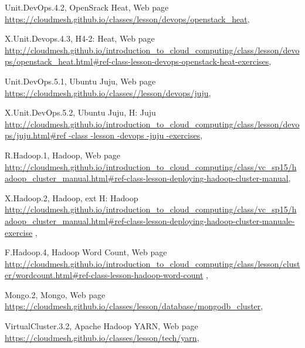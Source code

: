 Unit.DevOps.4.2, OpenSrack Heat, Web page \url{https://cloudmesh.github.io/classes/lesson/devops/openstack_heat}, 

X.Unit.Devops.4.3, H4-2: Heat, Web page \url{http://cloudmesh.github.io/introduction_to_cloud_computing/class/lesson/devops/openstack_heat.html#ref-class-lesson-devops-openstack-heat-exercises}, 

Unit.DevOps.5.1, Ubuntu Juju, Web page \url{https://cloudmesh.github.io/classes//lesson/devops/juju}, 

X.Unit.DevOps.5.2, Ubuntu Juju, H: Juju  \url{http://cloudmesh.github.io/introduction_to_cloud_computing/class/lesson/devops/juju.html#ref -class -lesson -devops -juju -exercises}, 

R.Hadoop.1, Hadoop, Web page \url{http://cloudmesh.github.io/introduction_to_cloud_computing/class/vc_sp15/hadoop_cluster_manual.html#ref-class-lesson-deploying-hadoop-cluster-manual}, 

X.Hadoop.2, Hadoop, ext H: Hadoop \url{http://cloudmesh.github.io/introduction_to_cloud_computing/class/vc_sp15/hadoop_cluster_manual.html#ref-class-lesson-deploying-hadoop-cluster-manuale-exercise}  , 


F.Hadoop.4, Hadoop Word Count, Web page \url{http://cloudmesh.github.io/introduction_to_cloud_computing/class/lesson/cluster/wordcount.html#ref-class-lesson-hadoop-word-count}  , 


Mongo.2, Mongo, Web page \url{https://cloudmesh.github.io/classes/lesson/database/mongodb_cluster}, 




VirtualCluster.3.2, Apache Hadoop YARN, Web page \url{https://cloudmesh.github.io/classes/lesson/tech/yarn},   


